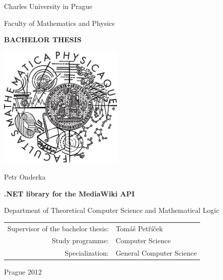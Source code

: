 \documentclass[12pt,a4paper]{report}
\begin{document}
\hypersetup{pageanchor=false}



\pagestyle{empty}
\begin{center}

\large

Charles University in Prague

\medskip

Faculty of Mathematics and Physics

\vfill

{\bf\Large BACHELOR THESIS}

\vfill

\centerline{\mbox{\includegraphics[width=60mm]{img/logo}}}

\vfill
\vspace{5mm}

{\LARGE Petr Onderka}

\vspace{15mm}

{\LARGE\bfseries .NET library for the MediaWiki API}

\vfill

Department of Theoretical Computer Science \linebreak and Mathematical Logic

\vfill

\begin{tabular}{rl}

Supervisor of the bachelor thesis: & Tomáš Petříček \\
\noalign{\vspace{2mm}}
Study programme: & Computer Science \\
\noalign{\vspace{2mm}}
Specialization: & General Computer Science \\
\end{tabular}

\vfill

Prague 2012

\end{center}
\end{document}
